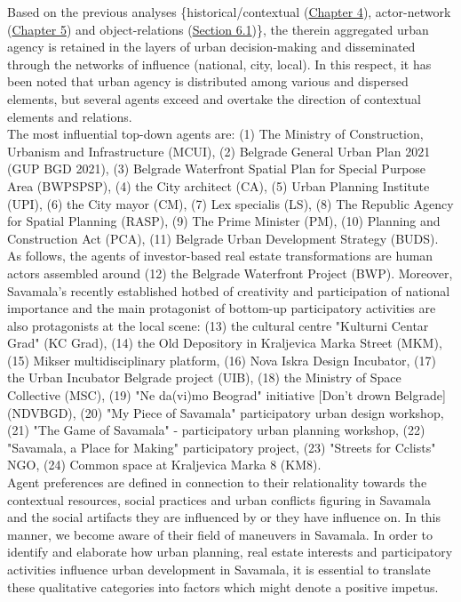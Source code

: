 \documentclass[11pt]{report}
\begin{document}
{{{{Based on the previous analyses \{historical/contextual (\href{Chapter 4}{Chapter 4}), actor-network (\href{Chapter 5}{Chapter 5}) and object-relations (\href{Section 6.1}{Section 6.1})\}, the therein aggregated urban agency is retained in the layers of urban decision-making and disseminated through the networks of influence (national, city, local).
In this respect, it has been noted that urban agency is distributed among various and dispersed elements, but several agents exceed and overtake the direction of contextual elements and relations.
\\

The most influential top-down agents are: 
(1) The Ministry of Construction, Urbanism and Infrastructure (MCUI),
(2) Belgrade General Urban Plan 2021 (GUP BGD 2021),
(3) Belgrade Waterfront Spatial Plan for Special Purpose Area (BWPSPSP), 
(4) the City architect (CA),
(5) Urban Planning Institute (UPI),
(6) the City mayor (CM),
(7) Lex specialis (LS),
(8) The Republic Agency for Spatial Planning (RASP),
(9) The Prime Minister (PM),
(10) Planning and Construction Act (PCA),
(11) Belgrade Urban Development Strategy (BUDS).
\\

As follows, the agents of investor-based real estate transformations are human actors assembled around
(12) the Belgrade Waterfront Project (BWP). Moreover, Savamala’s recently established  hotbed of creativity and participation of national importance and the main protagonist of bottom-up participatory activities are also protagonists at the local scene: (13) the cultural centre "Kulturni Centar Grad" (KC Grad),
(14) the Old Depository in Kraljevica Marka Street (MKM), (15) Mikser multidisciplinary platform, (16) Nova Iskra Design Incubator, (17) the Urban Incubator Belgrade project (UIB), (18) the Ministry of Space Collective (MSC),
(19) "Ne da(vi)mo Beograd" initiative [Don't drown Belgrade] (NDVBGD),
(20) "My Piece of Savamala" participatory urban design workshop,
(21) "The Game of Savamala" - participatory urban planning workshop,
(22) "Savamala, a Place for Making" participatory project,
(23) "Streets for Cclists" NGO,
(24) Common space at Kraljevica Marka 8 (KM8).
\\

Agent preferences are defined in connection to their relationality towards the contextual resources, social practices and urban conflicts figuring in Savamala and the social artifacts they are influenced by or they have influence on.
In this manner, we become aware of their field of maneuvers in Savamala.
In order to identify and elaborate how urban planning, real estate interests and participatory activities influence urban development in Savamala, it is essential to translate these qualitative categories into factors which might denote a positive impetus.
\\

}}}}
\end{document}
